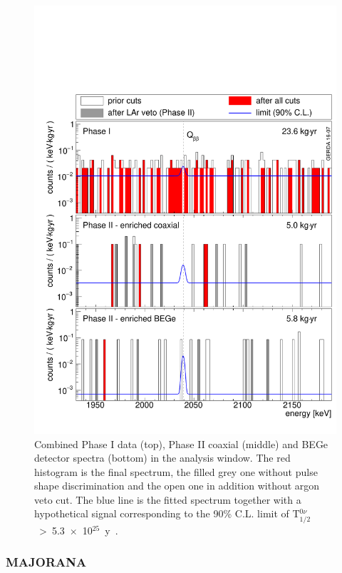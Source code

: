 \documentclass[main.tex]{subfiles}
\begin{document}
\begin{figure}[h!]
\begin{center}
\includegraphics[scale=0.45]{pictures/Chap2/GerdaPhase2.pdf}
\caption{Combined Phase I data (top), Phase II coaxial (middle) and BEGe detector spectra (bottom) in the analysis window. The red histogram is the final spectrum, the filled grey one without pulse shape discrimination and the open one in addition without argon veto cut. The blue line is the fitted spectrum together with a hypothetical signal corresponding to the 90\% C.L. limit of T$_{\text{1/2}}^{0\nu}$~>~5.3~$\times$~10$^{\text{25}}$~y~\cite{GERDAphase2}.}
\label{GERDAresults}
\end{center}
\end{figure}


\FloatBarrier


\subsubsection{MAJORANA}
\end{document}
